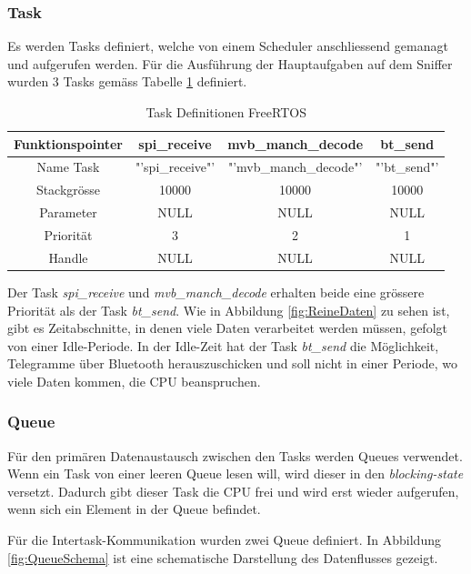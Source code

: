 \subsubsection{Task}
Es werden Tasks definiert, welche von einem Scheduler anschliessend gemanagt und aufgerufen werden. Für die Ausführung der Hauptaufgaben auf dem Sniffer wurden 3 Tasks gemäss Tabelle \ref{tab:TaskDefinitonen} definiert.

\begin{table}[H]
    \centering
    \begin{tabular}{|c||c|c|c|}
        \hline
        Funktionspointer & spi\_receive  & mvb\_manch\_decode & bt\_send\\ 
        \hline
        Name Task  & "'spi\_receive"' & "'mvb\_manch\_decode"' & "'bt\_send"'\\ 
        \hline
        Stackgrösse & 10000 & 10000 & 10000\\ 
        \hline
        Parameter & NULL & NULL & NULL\\ 
        \hline
        Priorität & 3 & 2 & 1\\ 
        \hline
        Handle & NULL & NULL & NULL\\ 
        \hline
    \end{tabular}
    \caption{Task Definitionen FreeRTOS}
    \label{tab:TaskDefinitonen}
\end{table}

Der Task \textit{spi\_receive} und \textit{mvb\_manch\_decode} erhalten beide eine grössere Priorität als der Task \textit{bt\_send}. Wie in Abbildung \ref{fig:ReineDaten} zu sehen ist, gibt es Zeitabschnitte, in denen viele Daten verarbeitet werden müssen, gefolgt von einer Idle-Periode. In der Idle-Zeit hat der Task \textit{bt\_send} die Möglichkeit, Telegramme über Bluetooth herauszuschicken und soll nicht in einer Periode, wo viele Daten kommen, die CPU beanspruchen.


\subsubsection{Queue}
\label{subsub:Queue}
Für den primären Datenaustausch zwischen den Tasks werden Queues verwendet. Wenn ein Task von einer leeren Queue lesen will, wird dieser in den \textit{blocking-state} versetzt. Dadurch gibt dieser Task die CPU frei und wird erst wieder aufgerufen, wenn sich ein Element in der Queue befindet.\cite{FREERTOS_QUEUE}

Für die Intertask-Kommunikation wurden zwei Queue definiert. In Abbildung \ref{fig:QueueSchema} ist eine schematische Darstellung des Datenflusses gezeigt.


